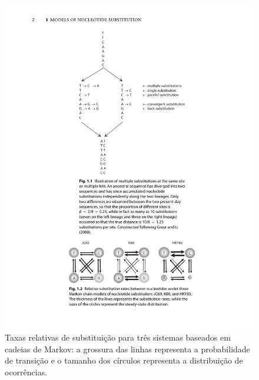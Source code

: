 \documentclass[english,brazilian]{UNISINOSmonografia} %
\newcommand\defaultFigureWidth{0.9}
\begin{document}
\begin{figure}[tb]
	\centering%
	\begin{minipage}{\defaultFigureWidth\textwidth}
		\caption[Taxas relativas de substituição para três sistemas baseados em cadeias de Markov.]{Taxas relativas de substituição para três sistemas baseados em cadeias de Markov: a grossura das linhas representa a probabilidade de transição e o tamanho dos círculos representa a distribuição de ocorrências.}
		\label{fig:models}
		\includegraphics[trim=130 95 120 500,clip,width=\textwidth]{yang2014molecular-fig1-2}
	\end{minipage}
\end{figure}
\end{document}
